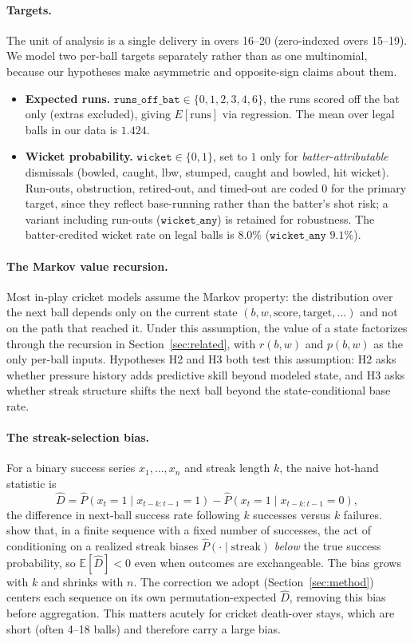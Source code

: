 \paragraph{Targets.}
The unit of analysis is a single delivery in overs 16--20 (zero-indexed overs
15--19). We model two per-ball targets separately rather than as one multinomial,
because our hypotheses make asymmetric and opposite-sign claims about them.
\begin{itemize}
  \item \textbf{Expected runs.} $\texttt{runs\_off\_bat} \in \{0,1,2,3,4,6\}$,
        the runs scored off the bat only (extras excluded), giving
        $E[\text{runs}]$ via regression. The mean over legal balls in our data is
        $1.424$.
  \item \textbf{Wicket probability.} $\texttt{wicket} \in \{0,1\}$, set to $1$
        only for \emph{batter-attributable} dismissals (bowled, caught, lbw,
        stumped, caught and bowled, hit wicket). Run-outs, obstruction,
        retired-out, and timed-out are coded $0$ for the primary target, since
        they reflect base-running rather than the batter's shot risk; a variant
        including run-outs ($\texttt{wicket\_any}$) is retained for robustness.
        The batter-credited wicket rate on legal balls is $8.0\%$
        ($\texttt{wicket\_any}$ $9.1\%$).
\end{itemize}

\paragraph{The Markov value recursion.}
Most in-play cricket models assume the Markov property: the distribution over the
next ball depends only on the current state $(b, w, \text{score}, \text{target},
\dots)$ and not on the path that reached it. Under this assumption, the value of a
state factorizes through the recursion in Section~\ref{sec:related}, with $r(b,w)$
and $p(b,w)$ as the only per-ball inputs. Hypotheses H2 and H3 both test this
assumption: H2 asks whether pressure history adds predictive skill beyond modeled
state, and H3 asks whether streak structure shifts the next ball beyond the
state-conditional base rate.

\paragraph{The streak-selection bias.}
For a binary success series $x_1, \dots, x_n$ and streak length $k$, the naive
hot-hand statistic is
\[
  \hat{D} = \hat{P}(x_t = 1 \mid x_{t-k:t-1} = 1) - \hat{P}(x_t = 1 \mid x_{t-k:t-1} = 0),
\]
the difference in next-ball success rate following $k$ successes versus $k$
failures. \citet{miller2018surprised} show that, in a finite sequence with a
fixed number of successes, the act of conditioning on a realized streak biases
$\hat{P}(\cdot \mid \text{streak})$ \emph{below} the true success probability, so
$\mathbb{E}[\hat{D}] < 0$ even when outcomes are exchangeable. The bias grows with
$k$ and shrinks with $n$. The correction we adopt (Section~\ref{sec:method})
centers each sequence on its own permutation-expected $\hat{D}$, removing this
bias before aggregation. This matters acutely for cricket death-over stays, which
are short (often 4--18 balls) and therefore carry a large bias.
